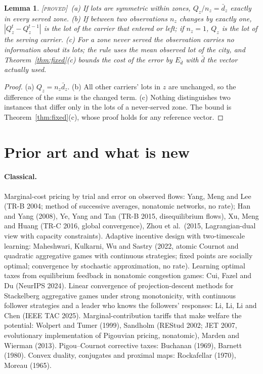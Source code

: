 \documentclass[11pt]{article}
\newtheorem{lemma}[theorem]{Lemma}
\theoremstyle{definition}
\theoremstyle{remark}
\newcommand{\dbar}{\bar d}
\newcommand{\PROVED}{{\normalfont\textsc{[proved]}}}
\begin{document}
\begin{lemma}\label{lem:lots}\PROVED\
(a) If lots are symmetric within zones, $Q_z/n_z=\dbar_z$ exactly in every served zone. (b) If between two observations $n_z$ changes by exactly one, $|Q_z^{t}-Q_z^{t-1}|$ is the lot of the carrier that entered or left; if $n_z=1$, $Q_z$ is the lot of the serving carrier. (c) For a zone never served the observation carries no information about its lots; the rule uses the mean observed lot of the city, and Theorem~\ref{thm:fixed}(c) bounds the cost of the error by $E_{\dbar}$ with $\dbar$ the vector actually used.
\end{lemma}
\begin{proof}
(a) $Q_z=n_z\dbar_z$. (b) All other carriers' lots in $z$ are unchanged, so the difference of the sums is the changed term. (c) Nothing distinguishes two instances that differ only in the lots of a never-served zone. The bound is Theorem~\ref{thm:fixed}(c), whose proof holds for any reference vector.
\end{proof}

\section{Prior art and what is new}\label{sec:prior}

\paragraph{Classical.} Marginal-cost pricing by trial and error on observed flows: Yang, Meng and Lee (TR-B 2004; method of successive averages, nonatomic networks, no rate); Han and Yang (2008), Ye, Yang and Tan (TR-B 2015, disequilibrium flows), Xu, Meng and Huang (TR-C 2016, global convergence), Zhou et al.\ (2015, Lagrangian-dual view with capacity constraints). Adaptive incentive design with two-timescale learning: Maheshwari, Kulkarni, Wu and Sastry (2022, atomic Cournot and quadratic aggregative games with continuous strategies; fixed points are socially optimal; convergence by stochastic approximation, no rate). Learning optimal taxes from equilibrium feedback in nonatomic congestion games: Cui, Fazel and Du (NeurIPS 2024). Linear convergence of projection-descent methods for Stackelberg aggregative games under strong monotonicity, with continuous follower strategies and a leader who knows the followers' responses: Li, Li, Li and Chen (IEEE TAC 2025). Marginal-contribution tariffs that make welfare the potential: Wolpert and Tumer (1999), Sandholm (REStud 2002; JET 2007, evolutionary implementation of Pigouvian pricing, nonatomic), Marden and Wierman (2013). Pigou--Cournot corrective taxes: Buchanan (1969), Barnett (1980). Convex duality, conjugates and proximal maps: Rockafellar (1970), Moreau (1965).
\end{document}
